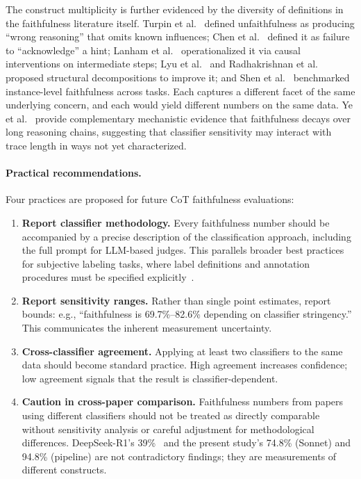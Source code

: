 The construct multiplicity is further evidenced by the diversity of definitions in the faithfulness literature itself. Turpin et al.~\cite{turpin2023unfaithful} defined unfaithfulness as producing ``wrong reasoning'' that omits known influences; Chen et al.~\cite{chen2025reasoning} defined it as failure to ``acknowledge'' a hint; Lanham et al.~\cite{lanham2023measuring} operationalized it via causal interventions on intermediate steps; Lyu et al.~\cite{lyu2023faithful} and Radhakrishnan et al.~\cite{radhakrishnan2023decomposition} proposed structural decompositions to improve it; and Shen et al.~\cite{shen2025faithcotbench} benchmarked instance-level faithfulness across tasks. Each captures a different facet of the same underlying concern, and each would yield different numbers on the same data. Ye et al.~\cite{ye2026faithfulness} provide complementary mechanistic evidence that faithfulness decays over long reasoning chains, suggesting that classifier sensitivity may interact with trace length in ways not yet characterized.

\paragraph{Practical recommendations.} Four practices are proposed for future CoT faithfulness evaluations:

\begin{enumerate}
    \item \textbf{Report classifier methodology.} Every faithfulness number should be accompanied by a precise description of the classification approach, including the full prompt for LLM-based judges. This parallels broader best practices for subjective labeling tasks, where label definitions and annotation procedures must be specified explicitly~\cite{plank2022problem, gordon2021disagreement}.
    \item \textbf{Report sensitivity ranges.} Rather than single point estimates, report bounds: e.g., ``faithfulness is 69.7\%--82.6\% depending on classifier stringency.'' This communicates the inherent measurement uncertainty.
    \item \textbf{Cross-classifier agreement.} Applying at least two classifiers to the same data should become standard practice. High agreement increases confidence; low agreement signals that the result is classifier-dependent.
    \item \textbf{Caution in cross-paper comparison.} Faithfulness numbers from papers using different classifiers should not be treated as directly comparable without sensitivity analysis or careful adjustment for methodological differences. DeepSeek-R1's 39\%~\cite{chen2025reasoning} and the present study's 74.8\% (Sonnet) and 94.8\% (pipeline) are not contradictory findings; they are measurements of different constructs.
\end{enumerate}

